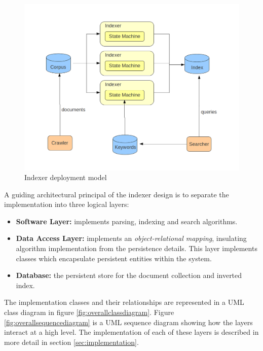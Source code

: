 \documentclass[10pt]{report}
\begin{document}
\begin{figure}
  \begin{center}
	\includegraphics[width=\textwidth,height=!]{deploymentmodel}
  \end{center}
  \caption{Indexer deployment model}
  \label{fig:deploymentmodel}
\end{figure} 

A guiding architectural principal of the indexer design is to separate the implementation
into three logical layers:
\begin{itemize}
\item \textbf{Software Layer:} implements parsing, indexing and search
  algorithms.
\item \textbf{Data Access Layer:} implements an
  \textit{object-relational mapping}, insulating algorithm
  implementation from the persistence details. This layer implements
  classes which encapsulate persistent entities within the system.
\item \textbf{Database:} the persistent store for the document
  collection and inverted index.
\end{itemize}

The implementation classes and their relationships are represented in
a UML class diagram in figure \ref{fig:overallclassdiagram}. Figure
\ref{fig:overallsequencediagram} is a UML sequence diagram showing how
the layers interact at a high level.  The implementation of each of
these layers is described in more detail in section
\ref{sec:implementation}.
\end{document}
